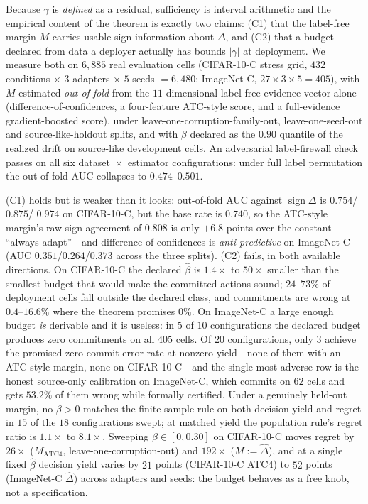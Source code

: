 \documentclass[conference]{IEEEtran}
\theoremstyle{plain}
\theoremstyle{definition}
\newcommand{\sign}{\operatorname{sign}}
\begin{document}
Because $\gamma$ is \emph{defined} as a residual, sufficiency is interval arithmetic and the
empirical content of the theorem is exactly two claims: (C1) that the label-free margin $M$ carries
usable sign information about $\Delta$, and (C2) that a budget declared from data a deployer
actually has bounds $|\gamma|$ at deployment. We measure both on $6{,}885$ real evaluation cells
(CIFAR-10-C stress grid, $432$ conditions $\times$ $3$ adapters $\times$ $5$ seeds $=6{,}480$;
ImageNet-C, $27\times3\times5=405$), with $M$ estimated \emph{out of fold} from the $11$-dimensional
label-free evidence vector alone (difference-of-confidences, a four-feature ATC-style score, and a
full-evidence gradient-boosted score), under leave-one-corruption-family-out, leave-one-seed-out and
source-like-holdout splits, and with $\beta$ declared as the $0.90$ quantile of the realized drift
on source-like development cells. An adversarial label-firewall check passes on all six
dataset~$\times$~estimator configurations: under full label permutation the out-of-fold AUC
collapses to $0.474$--$0.501$.

(C1) holds but is weaker than it looks: out-of-fold AUC against $\sign\Delta$ is $0.754$/$0.875$/
$0.974$ on CIFAR-10-C, but the base rate is $0.740$, so the ATC-style margin's raw sign agreement of
$0.808$ is only $+6.8$ points over the constant ``always adapt''---and difference-of-confidences is
\emph{anti-predictive} on ImageNet-C (AUC $0.351$/$0.264$/$0.373$ across the three splits).
(C2) fails, in both available directions. On CIFAR-10-C the declared $\widehat\beta$ is $1.4\times$
to $50\times$ smaller than the smallest budget that would make the committed actions sound;
$24$--$73\%$ of deployment cells fall outside the declared class, and commitments are wrong at
$0.4$--$16.6\%$ where the theorem promises $0\%$. On ImageNet-C a large enough budget \emph{is}
derivable and it is useless: in $5$ of $10$ configurations the declared budget produces zero
commitments on all $405$ cells. Of $20$ configurations, only $3$ achieve the promised zero
commit-error rate at nonzero yield---none of them with an ATC-style margin, none on CIFAR-10-C---and
the single most adverse row is the honest source-only calibration on ImageNet-C, which commits on
$62$ cells and gets $53.2\%$ of them wrong while formally certified. Under a genuinely held-out
margin, no $\beta>0$ matches the finite-sample rule on both decision yield and regret in $15$ of the
$18$ configurations swept; at matched yield the population rule's regret ratio is $1.1\times$ to
$8.1\times$. Sweeping $\beta\in[0,0.30]$ on CIFAR-10-C moves regret by $26\times$ ($M_{\mathrm{ATC4}}$,
leave-one-corruption-out) and $192\times$ ($M:=\widehat\Delta$), and at a single fixed
$\widehat\beta$ decision yield varies by $21$ points (CIFAR-10-C ATC4) to $52$ points (ImageNet-C
$\widehat\Delta$) across adapters and seeds: the budget behaves as a free knob, not a specification.
\end{document}
